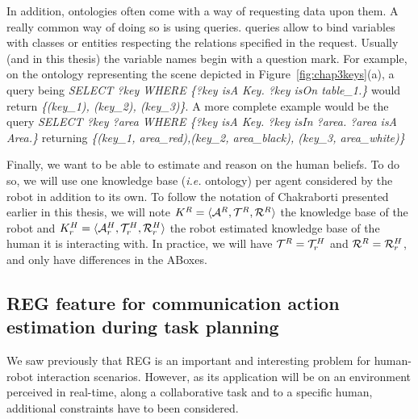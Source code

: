 \documentclass[a4paper,11pt,twoside]{StyleThese}
\begin{document}
In addition, ontologies often come with a way of requesting data upon them. A really common way of doing so is using \sparql{} queries. \sparql{} queries allow to bind variables with classes or entities respecting the relations specified in the request. Usually (and in this thesis) the variable names begin with a question mark. For example, on the ontology representing the scene depicted in Figure~\ref{fig:chap3keys}(a), a query being \textit{SELECT ?key WHERE \{?key isA Key. ?key isOn table\_1.\}} would return \textit{\{(key\_1), (key\_2), (key\_3)\}}. A more complete example would be the query \textit{SELECT ?key ?area WHERE \{?key isA Key. ?key isIn ?area. ?area isA Area.\}} returning \textit{\{(key\_1, area\_red),(key\_2, area\_black), (key\_3, area\_white)\}}


Finally, we want to be able to estimate and reason on the human beliefs. To do so, we will use one knowledge base (\textit{i.e.} ontology) per agent considered by the robot in addition to its own. To follow the notation of Chakraborti \cite{chakraborti2018human} presented earlier in this thesis, we will note $K^R = \langle \mathcal{A}^R, \mathcal{T}^R, \mathcal{R}^R \rangle$ the knowledge base of the robot and $K^H_r = \langle \mathcal{A}^H_r, \mathcal{T}^H_r, \mathcal{R}^H_r \rangle$ the robot estimated knowledge base of the human it is interacting with. In practice, we will have $\mathcal{T}^R = \mathcal{T}^H_r$ and $\mathcal{R}^R = \mathcal{R}^H_r$, and only have differences in the ABoxes.

\subsection{REG feature for communication action estimation during task planning}
We saw previously that REG is an important and interesting problem for human-robot interaction scenarios. However, as its application will be on an environment perceived in real-time, along a collaborative task and to a specific human, additional constraints have to been considered.
\end{document}
